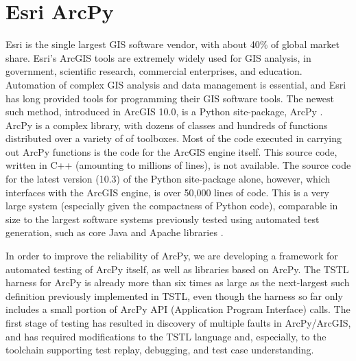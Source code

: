 \section{Esri ArcPy}


Esri is the single largest GIS software vendor, with about 40\% of
global market share.  Esri's ArcGIS tools are extremely widely used
for GIS analysis, in government, scientific research, commercial
enterprises, and education.  Automation of complex GIS analysis and
data management is essential, and Esri has long provided tools for
programming their GIS software tools.  The newest such method,
introduced in ArcGIS 10.0, is a Python site-package, ArcPy
\cite{ArcPy}.  ArcPy is a complex library, with dozens of classes and
hundreds of functions distributed over a variety of of toolboxes.
Most of the code executed in carrying out ArcPy functions is the code
for the ArcGIS engine itself.  This source code, written in C++
(amounting to millions of lines), is
not available.  The source code for the latest version (10.3) of the
Python site-package alone, however, which interfaces with the ArcGIS
engine, is over 50,000 lines of code.  This is a very large system
(especially given the compactness of Python code), comparable in size
to the largest software systems previously tested using automated test
generation, such as core Java and Apache libraries
\cite{FA11,Pacheco}.

In order to improve the reliability of ArcPy, we are developing a
framework for automated testing of ArcPy itself, as well as libraries
based on ArcPy.  The TSTL harness for ArcPy is already more than six times as
large as the next-largest such definition previously implemented in
TSTL, even though the harness so far only includes a small portion of ArcPy
API (Application Program Interface) calls. The first stage of testing has resulted in discovery of
multiple faults in ArcPy/ArcGIS, and has required modifications to the
TSTL language and, especially, to the toolchain supporting test replay,
debugging, and test case understanding.




